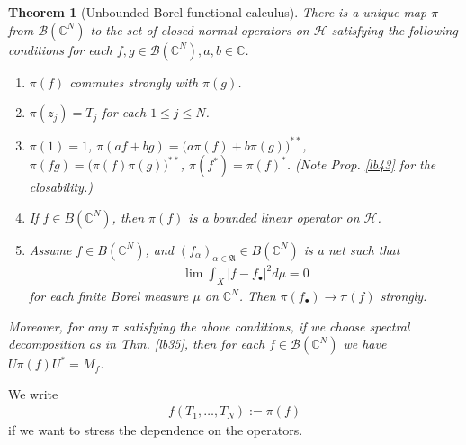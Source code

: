 \documentclass[12pt,b5paper,notitlepage]{article}
\theoremstyle{definition}
\theoremstyle{plain}
\newtheorem{thm}[df]{Theorem}
\newcommand{\fk}{\mathfrak}
\newcommand{\mc}{\mathcal}
\newcommand{\scr}{\mathscr}
\newcommand{\blt}{\bullet}
\newcommand{\Cbb}{\mathbb C}
\numberwithin{equation}{section}
\begin{document}
\begin{thm}[Unbounded Borel functional calculus]\label{lb47}
There is a unique map $\pi$ from $\scr B(\Cbb^N)$ to the set of closed normal operators on $\mc H$ satisfying the following conditions for each $f,g\in\scr B(\Cbb^N),a,b\in\Cbb$.
\begin{enumerate}
\item $\pi(f)$ commutes strongly with $\pi(g)$.
\item $\pi(z_j)=T_j$ for each $1\leq j\leq N$.
\item $\pi(1)=1$, $\pi(af+bg)=\big(a\pi(f)+b\pi(g)\big)^{**}$, $\pi(fg)=\big(\pi(f)\pi(g)\big)^{**}$, $\pi(f^*)=\pi(f)^*$. (Note Prop. \ref{lb43} for the closability.)
\item If $f\in B(\Cbb^N)$, then $\pi(f)$ is a bounded linear operator on $\mc H$.
\item Assume $f\in B(\Cbb^N)$, and $(f_\alpha)_{\alpha\in\fk A}\in B(\Cbb^N)$ is a net such that 
\begin{align}\label{eq32}
\lim \int_X|f-f_\blt|^2d\mu=0
\end{align}
for each finite Borel measure $\mu$ on $\Cbb^N$. Then $\pi(f_\blt)\rightarrow\pi(f)$ strongly. 
\end{enumerate}
Moreover, for any $\pi$ satisfying the above conditions, if we choose spectral decomposition as in Thm. \ref{lb35}, then for each $f\in\scr B(\Cbb^N)$ we have $U\pi(f)U^*=M_f$.
\end{thm}

We write
\begin{align}
f(T_1,\dots,T_N):=\pi(f)	
\end{align}
if we want to stress the dependence on the operators.
\end{document}

